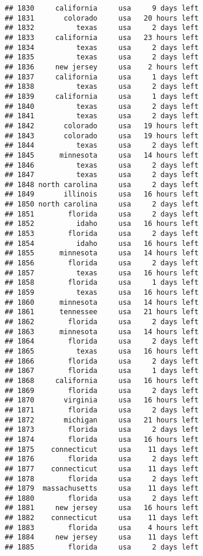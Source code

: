 \documentclass[
]{article}
\begin{document}
\begin{verbatim}
## 1830     california     usa     9 days left
## 1831       colorado     usa   20 hours left
## 1832          texas     usa     2 days left
## 1833     california     usa   23 hours left
## 1834          texas     usa     2 days left
## 1835          texas     usa     2 days left
## 1836     new jersey     usa    2 hours left
## 1837     california     usa     1 days left
## 1838          texas     usa     2 days left
## 1839     california     usa     1 days left
## 1840          texas     usa     2 days left
## 1841          texas     usa     2 days left
## 1842       colorado     usa   19 hours left
## 1843       colorado     usa   19 hours left
## 1844          texas     usa     2 days left
## 1845      minnesota     usa   14 hours left
## 1846          texas     usa     2 days left
## 1847          texas     usa     2 days left
## 1848 north carolina     usa     2 days left
## 1849       illinois     usa   16 hours left
## 1850 north carolina     usa     2 days left
## 1851        florida     usa     2 days left
## 1852          idaho     usa   16 hours left
## 1853        florida     usa     2 days left
## 1854          idaho     usa   16 hours left
## 1855      minnesota     usa   14 hours left
## 1856        florida     usa     2 days left
## 1857          texas     usa   16 hours left
## 1858        florida     usa     1 days left
## 1859          texas     usa   16 hours left
## 1860      minnesota     usa   14 hours left
## 1861      tennessee     usa   21 hours left
## 1862        florida     usa     2 days left
## 1863      minnesota     usa   14 hours left
## 1864        florida     usa     2 days left
## 1865          texas     usa   16 hours left
## 1866        florida     usa     2 days left
## 1867        florida     usa     1 days left
## 1868     california     usa   16 hours left
## 1869        florida     usa     2 days left
## 1870       virginia     usa   16 hours left
## 1871        florida     usa     2 days left
## 1872       michigan     usa   21 hours left
## 1873        florida     usa     2 days left
## 1874        florida     usa   16 hours left
## 1875    connecticut     usa    11 days left
## 1876        florida     usa     2 days left
## 1877    connecticut     usa    11 days left
## 1878        florida     usa     2 days left
## 1879  massachusetts     usa    11 days left
## 1880        florida     usa     2 days left
## 1881     new jersey     usa   16 hours left
## 1882    connecticut     usa    11 days left
## 1883        florida     usa    4 hours left
## 1884     new jersey     usa    11 days left
## 1885        florida     usa     2 days left

\end{verbatim}
\end{document}
